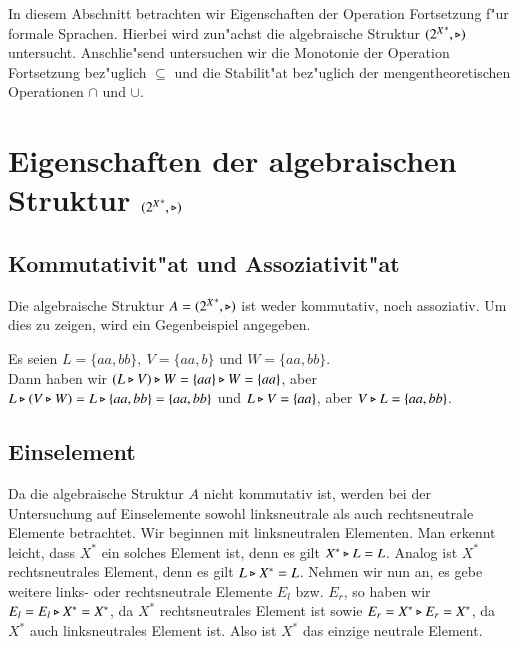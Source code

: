 In diesem Abschnitt betrachten wir Eigenschaften der Operation Fortsetzung f"ur formale Sprachen.
Hierbei wird zun"achst die algebraische Struktur $({2^X}^*,\triangleright)$ untersucht. Anschlie"send untersuchen wir die Monotonie der Operation Fortsetzung bez"uglich $\subseteq$ und die Stabilit"at bez"uglich der mengentheoretischen Operationen $\cap$ und $\cup$.

\section{Eigenschaften der algebraischen Struktur $({2^X}^*,\triangleright)$}

\subsection{Kommutativit"at und Assoziativit"at}
Die algebraische Struktur $A=({2^X}^*,\triangleright)$ ist weder kommutativ, noch assoziativ. Um dies zu zeigen, wird ein Gegenbeispiel angegeben.

\vspace{2ex}

\begin{beispiel}
Es seien $L=\{aa,bb\},\ V = \{aa,b\}$ und $W=\{aa,bb\}$. \\Dann haben wir $(L\triangleright V)\triangleright W = \{aa\} \triangleright W = \{aa\}$, aber $L\triangleright (V\triangleright W) = L\triangleright \{aa,bb\} = \{aa,bb\}$ und $L\triangleright V = \{aa\}$, aber $V\triangleright L=\{aa,bb\}$.
\end{beispiel}

\subsection{Einselement}

Da die algebraische Struktur $A$ nicht kommutativ ist, werden bei der Untersuchung auf Einselemente sowohl linksneutrale als auch rechtsneutrale Elemente betrachtet.
Wir beginnen mit linksneutralen Elementen.
Man erkennt leicht, dass $X^*$ ein solches Element ist, denn es gilt $X^*\triangleright L = L$.
Analog ist $X^*$ rechtsneutrales Element, denn es gilt $L\triangleright X^* = L$.
Nehmen wir nun an, es gebe weitere links- oder rechtsneutrale Elemente $E_l$ bzw. $E_r$, so haben wir $E_l=E_l\triangleright X^* = X^*$, da $X^*$ rechtsneutrales Element ist sowie $E_r = X^*\triangleright E_r = X^*$, da $X^*$ auch linksneutrales Element ist. Also ist $X^*$ das einzige neutrale Element.

